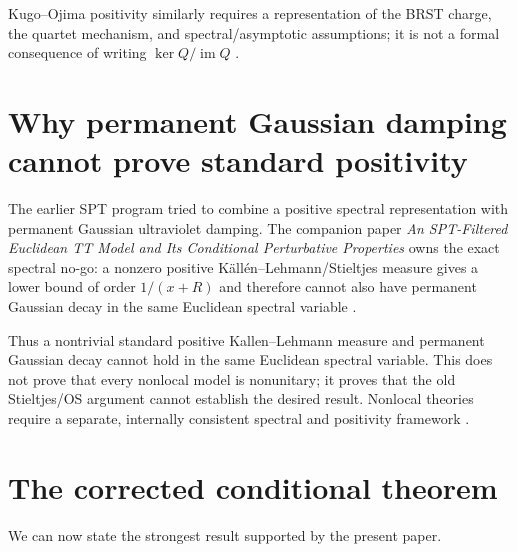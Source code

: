 \documentclass[11pt]{article}
\begin{document}
Kugo--Ojima positivity similarly requires a representation of the BRST charge,
the quartet mechanism, and spectral/asymptotic assumptions; it is not a formal
consequence of writing $\ker Q/\operatorname{im}Q$
\cite{KugoOjima1979,KalauVanHolten1991}.

\section{Why permanent Gaussian damping cannot prove standard positivity}

The earlier SPT program tried to combine a positive spectral representation
with permanent Gaussian ultraviolet damping.  The companion paper
\emph{An SPT-Filtered Euclidean TT Model and Its Conditional Perturbative
Properties} owns the exact spectral no-go: a nonzero positive
K\"all\'en--Lehmann/Stieltjes measure gives a lower bound of order
$1/(x+R)$ and therefore cannot also have permanent Gaussian decay in the
same Euclidean spectral variable \cite{MTTSPTCorrection}.

Thus a nontrivial standard positive Kallen--Lehmann measure and permanent
Gaussian decay cannot hold in the same Euclidean spectral variable.  This does
not prove that every nonlocal model is nonunitary; it proves that the old
Stieltjes/OS argument cannot establish the desired result.  Nonlocal theories
require a separate, internally consistent spectral and positivity framework
\cite{AsoreyRachwalShapiro2018,MTTSPTCorrection}.

\section{The corrected conditional theorem}

We can now state the strongest result supported by the present paper.
\end{document}
